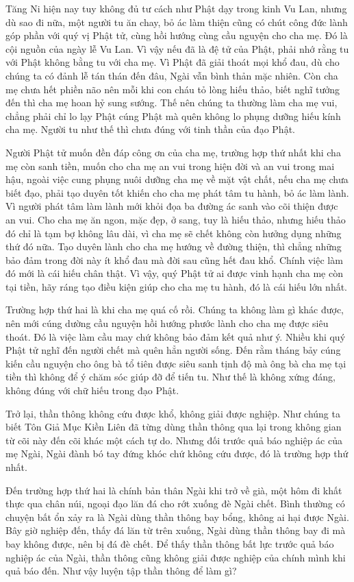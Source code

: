 \documentclass[
  12pt,
  oneside]{book}
\begin{document}
Tăng Ni hiện nay tuy không đủ tư cách như Phật dạy trong kinh Vu Lan, nhưng dù sao đi nữa, một người tu ăn chay, bỏ ác làm thiện cũng có chút công đức lành góp phần với quý vị Phật tử, cùng hồi hướng cùng cầu nguyện cho cha mẹ. Đó là cội nguồn của ngày lễ Vu Lan. Vì vậy nếu đã là đệ tử của Phật, phải nhớ rằng tu với Phật không bằng tu với cha mẹ. Vì Phật đã giải thoát mọi khổ đau, dù cho chúng ta có đảnh lễ tán thán đến đâu, Ngài vẫn bình thản mặc nhiên. Còn cha mẹ chưa hết phiền não nên mỗi khi con cháu tỏ lòng hiếu thảo, biết nghĩ tưởng đến thì cha mẹ hoan hỷ sung sướng. Thế nên chúng ta thường làm cha mẹ vui, chẳng phải chỉ lo lạy Phật cúng Phật mà quên không lo phụng dưỡng hiếu kính cha mẹ. Người tu như thế thì chưa đúng với tinh thần của đạo Phật.

Người Phật tử muốn đền đáp công ơn của cha mẹ, trường hợp thứ nhất khi cha mẹ còn sanh tiền, muốn cho cha mẹ an vui trong hiện đời và an vui trong mai hậu, ngoài việc cung phụng nuôi dưỡng cha mẹ về mặt vật chất, nếu cha mẹ chưa biết đạo, phải tạo duyên tốt khiến cho cha mẹ phát tâm tu hành, bỏ ác làm lành. Vì người phát tâm làm lành mới khỏi đọa ba đường ác sanh vào cõi thiện được an vui. Cho cha mẹ ăn ngon, mặc đẹp, ở sang, tuy là hiếu thảo, nhưng hiếu thảo đó chỉ là tạm bợ không lâu dài, vì cha mẹ sẽ chết không còn hưởng dụng những thứ đó nữa. Tạo duyên lành cho cha mẹ hướng về đường thiện, thì chẳng những bảo đảm trong đời này ít khổ đau mà đời sau cũng hết đau khổ. Chính việc làm đó mới là cái hiếu chân thật. Vì vậy, quý Phật tử ai được vinh hạnh cha mẹ còn tại tiền, hãy ráng tạo điều kiện giúp cho cha mẹ tu hành, đó là cái hiếu lớn nhất.

Trường hợp thứ hai là khi cha mẹ quá cố rồi. Chúng ta không làm gì khác được, nên mới cúng dường cầu nguyện hồi hướng phước lành cho cha mẹ được siêu thoát. Đó là việc làm cầu may chứ không bảo đảm kết quả như ý. Nhiều khi quý Phật tử nghĩ đến người chết mà quên hẳn người sống. Đến rằm tháng bảy cúng kiến cầu nguyện cho ông bà tổ tiên được siêu sanh tịnh độ mà ông bà cha mẹ tại tiền thì không để ý chăm sóc giúp đỡ để tiến tu. Như thế là không xứng đáng, không đúng với chữ hiếu trong đạo Phật.

Trở lại, thần thông không cứu được khổ, không giải được nghiệp. Như chúng ta biết Tôn Giả Mục Kiền Liên đã từng dùng thần thông qua lại trong không gian từ cõi này đến cõi khác một cách tự do. Nhưng đối trước quả báo nghiệp ác của mẹ Ngài, Ngài đành bó tay đứng khóc chứ không cứu được, đó là trường hợp thứ nhất.

Đến trường hợp thứ hai là chính bản thân Ngài khi trở về già, một hôm đi khất thực qua chân núi, ngoại đạo lăn đá cho rớt xuống đè Ngài chết. Bình thường có chuyện bất ổn xảy ra là Ngài dùng thần thông bay bổng, không ai hại được Ngài. Bây giờ nghiệp đến, thấy đá lăn từ trên xuống, Ngài dùng thần thông bay đi mà bay không được, nên bị đá đè chết. Để thấy thần thông bất lực trước quả báo nghiệp ác của Ngài, thần thông cũng không giải được nghiệp của chính mình khi quả báo đến. Như vậy luyện tập thần thông để làm gì?
\end{document}
